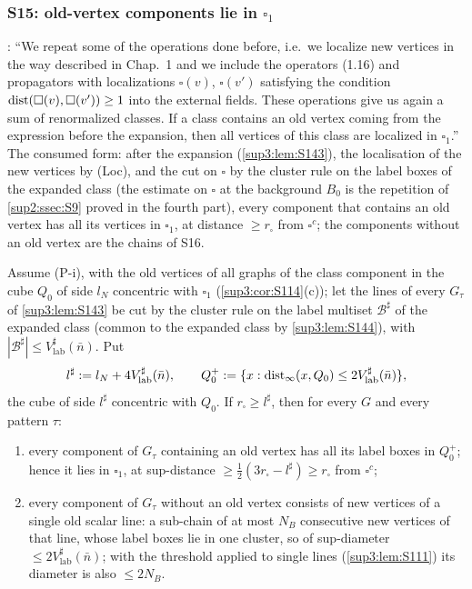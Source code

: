 
\subsubsection{S15: old-vertex components lie in $\square_1$}\label{sup3:ssec:S15}

\cite[p.~433]{Ba3}: ``We repeat some of the operations done before, i.e.\ we localize new vertices in the way described in Chap.~1 and we include the operators (1.16) and propagators with localizations $\square(v)$, $\square(v')$ satisfying the condition $\operatorname{dist}(\square(v),\square(v'))\ge1$ into the external fields. These operations give us again a sum of renormalized classes. If a class contains an old vertex coming from the expression before the expansion, then all vertices of this class are localized in $\square_1$.'' The consumed form: after the expansion (\cref{sup3:lem:S143}), the localisation of the new vertices by (Loc), and the cut on $\square$ by the cluster rule on the label boxes of the expanded class (the estimate \cite[(3.1)]{Ba3} on $\square$ at the background $B_0$ is the repetition of \cref{sup2:ssec:S9} proved in the fourth part), every component that contains an old vertex has all its vertices in $\square_1$, at distance $\ge r_\square$ from $\square^c$; the components without an old vertex are the chains of S16.

\begin{lemma}\label{sup3:lem:S15}
Assume (P-i), with the old vertices of all graphs of the class component in the cube $Q_0$ of side $l_N$ concentric with $\square_1$ (\cref{sup3:cor:S114}(c)); let the lines of every $G_\tau$ of \cref{sup3:lem:S143} be cut by the cluster rule on the label multiset $\mathcal B^\sharp$ of the expanded class (common to the expanded class by \cref{sup3:lem:S144}), with $|\mathcal B^\sharp|\le V^\sharp_{\mathrm{lab}}(\bar n)$. Put
\[
l^\sharp:= l_N+4V^\sharp_{\mathrm{lab}}(\bar n),\qquad Q_0^+:=\{x:\operatorname{dist}_\infty(x,Q_0)\le2V^\sharp_{\mathrm{lab}}(\bar n)\},
\]
the cube of side $l^\sharp$ concentric with $Q_0$. If $r_\square\ge l^\sharp$, then for every $G$ and every pattern $\tau$:
\begin{enumerate}[label=\textup{(\alph*)},nosep,leftmargin=*]
\item every component of $G_\tau$ containing an old vertex has all its label boxes in $Q_0^+$; hence it lies in $\square_1$, at sup-distance $\ge\frac12(3r_\square-l^\sharp)\ge r_\square$ from $\square^c$;
\item every component of $G_\tau$ without an old vertex consists of new vertices of a single old scalar line: a sub-chain of at most $N_B$ consecutive new vertices of that line, whose label boxes lie in one cluster, so of sup-diameter $\le2V^\sharp_{\mathrm{lab}}(\bar n)$; with the threshold applied to single lines (\cref{sup3:lem:S111}) its diameter is also $\le2N_B$.
\end{enumerate}
\end{lemma}

